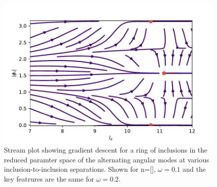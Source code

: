\begin{figure}[h!]
\centering
\includegraphics[width=12cm]{elastic_figs/streams.pdf}
\caption{Stream plot showing gradient descent for a ring of inclusions in the reduced paramter space of the alternating angular modes at various inclusion-to-inclusion separations. Shown for n=[], $\omega=0.1$ and the key featrures are the same for $\omega=0.2$.}
\label{fig:ring_stream}
\end{figure}

